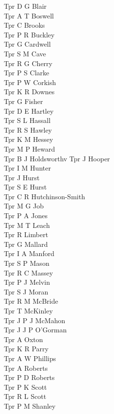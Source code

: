 \begin{multicols}{4}
  Tpr D G Blair \\
  Tpr A T Boswell \\
  Tpr C Brooks \\
  Tpr P R Buckley \\
  Tpr G Cardwell \\
  Tpr S M Cave \\
  Tpr R G Cherry \\
  Tpr P S Clarke \\
  Tpr P W Corkish \\
  Tpr K R Downes \\
  Tpr G Fisher \\
  Tpr D E Hartley \\
  Tpr S L Hassall \\
  Tpr R S Hawley \\
  Tpr K M Hessey \\
  Tpr M P Heward \\
  Tpr B J Holdsworthv
  Tpr J Hooper \\
  Tpr I M Hunter \\
  Tpr J Hurst \\
  Tpr S E Hurst \\
  Tpr C R Hutchinson-Smith \\
  Tpr M G Job \\
  Tpr P A Jones \\
  Tpr M T Leach \\
  Tpr R Limbert \\
  Tpr G Mallard \\
  Tpr I A Manford \\
  Tpr S P Mason \\
  Tpr R C Massey \\
  Tpr P J Melvin \\
  Tpr S J Moran \\
  Tpr R M McBride \\
  Tpr T McKinley \\
  Tpr J P J McMahon \\
  Tpr J J P O'Gorman \\
  Tpr A Oxton \\
  Tpr K R Parry \\
  Tpr A W Phillips \\
  Tpr A Roberts \\
  Tpr P D Roberts \\
  Tpr P K Scott \\
  Tpr R L Scott \\
  Tpr P M Shanley \\

\end{multicols}
